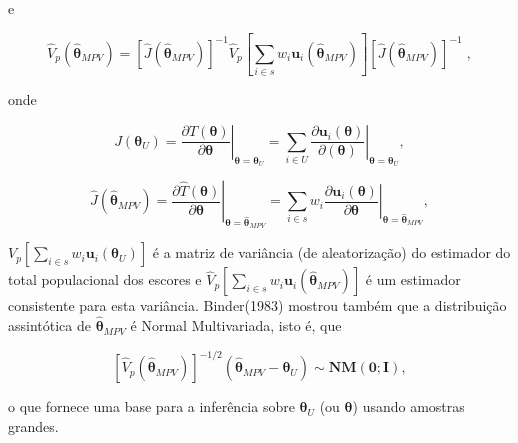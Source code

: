 \documentclass[]{book}
\theoremstyle{definition}
\theoremstyle{definition}
\theoremstyle{definition}
\theoremstyle{remark}
\begin{document}
e

\begin{equation}
\hat{V}_{p}\left( \mathbf{\hat{\theta}}_{MPV}\right) =\left[ \hat{J}\left( 
\mathbf{\hat{\theta}}_{MPV}\right) \right] ^{-1}\hat{V}_{p}\left[ \sum_{i\in
s}w_{i}\mathbf{u}_{i}\left( \mathbf{\hat{\theta}}_{MPV}\right) \right]
\left[ \hat{J}\left( \mathbf{\hat{\theta}}_{MPV}\right) \right] ^{-1}\;,
\label{eq:modpar9}
\end{equation}

onde

\begin{equation}
J\left( \mathbf{\theta }_{U}\right) =\left. \frac{\partial T\left( \mathbf{
\theta }\right) }{\partial \mathbf{\theta }}\right| _{\mathbf{\theta =\theta 
}_{U}}=\sum_{i\in U}\left. \frac{\partial \mathbf{u}_{i}\left( \mathbf{
\theta }\right) }{\partial \left( \mathbf{\theta }\right) }\right| _{\mathbf{
\theta =\theta }_{U}},  
\label{eq:modpar10}
\end{equation}

\begin{equation}
\hat{J}\left( \mathbf{\hat{\theta}}_{MPV}\right) =\left. \frac{\partial 
\widehat{T}\left( \mathbf{\theta }\right) }{\partial \mathbf{\theta }}
\right| _{\mathbf{\theta =\hat{\theta}}_{MPV}}=\sum_{i\in s}w_{i}\left. 
\frac{\partial \mathbf{u}_{i}\left( \mathbf{\theta }\right) }{\partial 
\mathbf{\theta }}\right| _{\mathbf{\theta =\hat{\theta}}_{MPV}},
\label{eq:modpar11}
\end{equation}

\(V_{p}\left[\sum_{i\in s}w_{i}\mathbf{u}_{i}\left( \mathbf{\theta}_{U}\right) \right]\)
é a matriz de variância (de aleatorização) do estimador do total
populacional dos escores e
\(\hat{V}_{p}\left[\sum_{i\in s}w_{i}\mathbf{u}_{i}\left(\mathbf{\hat{\theta}}_{MPV}\right)\right]\)
é um estimador consistente para esta variância. Binder(1983) mostrou
também que a distribuição assintótica de \(\mathbf{\hat{\theta}}_{MPV}\)
é Normal Multivariada, isto é, que

\begin{equation}
\left[ \hat{V}_{p}\left( \mathbf{\hat{\theta}}_{MPV}\right) \right]^{-1/2}\left(\mathbf{\hat{\theta}}_{MPV}-\mathbf{\theta }_{U}\right) \sim  \mathbf{NM}\left(\mathbf{0};\mathbf{I}\right),  
\label{eq:modpar12}
\end{equation}

o que fornece uma base para a inferência sobre \(\mathbf{\theta }_{U}\)
(ou \(\mathbf{\theta }\)) usando amostras grandes.
\end{document}
